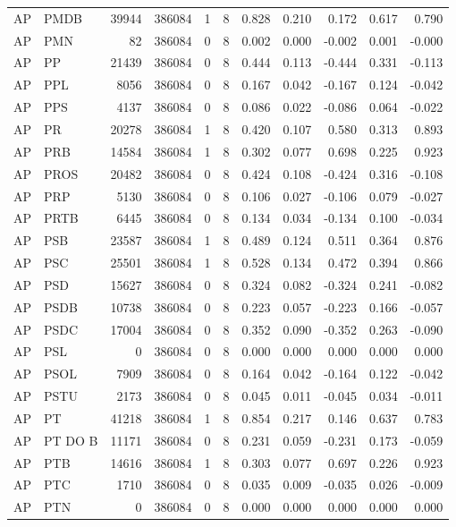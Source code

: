 \begin{landscape}
\begin{longtable}{llrrrrrrrrr}
AP & PMDB & 39944 & 386084 & 1 & 8 & 0.828 & 0.210 & 0.172 & 0.617 & 0.790 \\
AP & PMN & 82 & 386084 & 0 & 8 & 0.002 & 0.000 & -0.002 & 0.001 & -0.000 \\
AP & PP & 21439 & 386084 & 0 & 8 & 0.444 & 0.113 & -0.444 & 0.331 & -0.113 \\
AP & PPL & 8056 & 386084 & 0 & 8 & 0.167 & 0.042 & -0.167 & 0.124 & -0.042 \\
AP & PPS & 4137 & 386084 & 0 & 8 & 0.086 & 0.022 & -0.086 & 0.064 & -0.022 \\
AP & PR & 20278 & 386084 & 1 & 8 & 0.420 & 0.107 & 0.580 & 0.313 & 0.893 \\
AP & PRB & 14584 & 386084 & 1 & 8 & 0.302 & 0.077 & 0.698 & 0.225 & 0.923 \\
AP & PROS & 20482 & 386084 & 0 & 8 & 0.424 & 0.108 & -0.424 & 0.316 & -0.108 \\
AP & PRP & 5130 & 386084 & 0 & 8 & 0.106 & 0.027 & -0.106 & 0.079 & -0.027 \\
AP & PRTB & 6445 & 386084 & 0 & 8 & 0.134 & 0.034 & -0.134 & 0.100 & -0.034 \\
AP & PSB & 23587 & 386084 & 1 & 8 & 0.489 & 0.124 & 0.511 & 0.364 & 0.876 \\
AP & PSC & 25501 & 386084 & 1 & 8 & 0.528 & 0.134 & 0.472 & 0.394 & 0.866 \\
AP & PSD & 15627 & 386084 & 0 & 8 & 0.324 & 0.082 & -0.324 & 0.241 & -0.082 \\
AP & PSDB & 10738 & 386084 & 0 & 8 & 0.223 & 0.057 & -0.223 & 0.166 & -0.057 \\
AP & PSDC & 17004 & 386084 & 0 & 8 & 0.352 & 0.090 & -0.352 & 0.263 & -0.090 \\
AP & PSL & 0 & 386084 & 0 & 8 & 0.000 & 0.000 & 0.000 & 0.000 & 0.000 \\
AP & PSOL & 7909 & 386084 & 0 & 8 & 0.164 & 0.042 & -0.164 & 0.122 & -0.042 \\
AP & PSTU & 2173 & 386084 & 0 & 8 & 0.045 & 0.011 & -0.045 & 0.034 & -0.011 \\
AP & PT & 41218 & 386084 & 1 & 8 & 0.854 & 0.217 & 0.146 & 0.637 & 0.783 \\
AP & PT DO B & 11171 & 386084 & 0 & 8 & 0.231 & 0.059 & -0.231 & 0.173 & -0.059 \\
AP & PTB & 14616 & 386084 & 1 & 8 & 0.303 & 0.077 & 0.697 & 0.226 & 0.923 \\
AP & PTC & 1710 & 386084 & 0 & 8 & 0.035 & 0.009 & -0.035 & 0.026 & -0.009 \\
AP & PTN & 0 & 386084 & 0 & 8 & 0.000 & 0.000 & 0.000 & 0.000 & 0.000 \\

\end{longtable}
\end{landscape}

